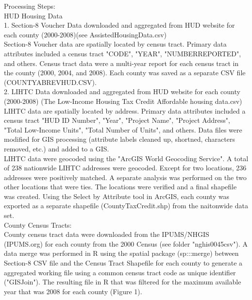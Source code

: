 \documentclass{article}\usepackage[]{graphicx}\usepackage[]{color}
\begin{document}
Processing Steps:\\
HUD Housing Data\\
1. Section-8 Voucher Data downloaded and aggregated from HUD website for each county (2000-2008)(see Assisted\textunderscore Housing\textunderscore Data.csv)\\
Section-8 Voucher data are spatially located by census tract. Primary data attributes included a census tract "CODE", "YEAR", "NUMBER\textunderscore REPORTED", and others. Census tract data were a multi-year report for each census tract in the county (2000, 2004, and 2008). Each county was saved as a separate CSV file (COUNTY\textunderscore ABREV\textunderscore HUD.CSV).  \\
2. LIHTC Data downloaded and aggregated from HUD website for each county (2000-2008) (The Low-Income Housing Tax Credit Affordable housing data.csv) LIHTC data are spatially located by address. Primary data attributes included a census tract "HUD ID Number", "Year", "Project Name", "Project Address", "Total Low-Income Units", "Total Number of Units", and others.
Data files were modified for GIS processing (attribute labels cleaned up, shortned, characters removed, etc.) and added to a GIS.\\
LIHTC data were geocoded using the "ArcGIS World Geocoding Service". A total of 238 nationwide LIHTC addresses were geocoded. Except for two locations, 236 addresses were positively matched. A separate analysis was performed on the two other locations that were ties. The locations were verified and a final shapefile was created. Using the Select by Attribute tool in ArcGIS, each county was exported as a separate shapefile (County\textunderscore Tax\textunderscore Credit.shp) from the naitonwide data set.\\

County Census Tracts:\\
County census tract data were downloaded from the IPUMS/NHGIS (IPUMS.org) for each county from the 2000 Census (see folder "nghis0045\textunderscore csv"). A data merge was performed in R using the spatial package (sp:::merge) between Section-8 CSV file and the Census Tract Shapefile for each county to generate a aggregated working file using a common census tract code as unique identifier ("GISJoin"). The resulting file in R that was filtered for the maximum available year that was 2008 for each county (Figure 1).\\
\end{document}

